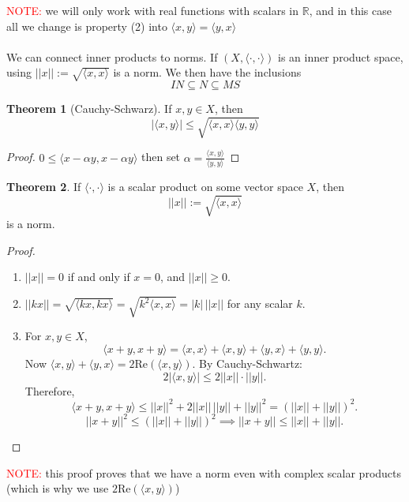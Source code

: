 \documentclass[11pt,a4paper]{article}
\theoremstyle{definition}
\newtheorem{theorem}{Theorem}[section]
\begin{document}
\noindent \textcolor{red}{NOTE:} we will only work with real functions with scalars in $\mathbb{R}$, and in this case all we change is property (2) into $\langle x, y \rangle = {\langle y, x \rangle}$
~\\ ~\\
We can connect inner products to norms. If $(X, \langle \cdot ,\cdot \rangle)$ is an inner product space, using $||x|| := \sqrt{\langle x,x\rangle }$ is a norm. We then have the inclusions 
\[
IN \subseteq N \subseteq MS
\]

\begin{theorem}[Cauchy-Schwarz]
    If $x,y\in X$, then 
    \[
    |\langle x,y \rangle | \le \sqrt{\langle x,x \rangle  \langle y,y\rangle} 
    \]
\end{theorem}

\begin{proof}
    $0 \le \langle x - \alpha y, x - \alpha y\rangle$ then set $\alpha = \frac{\langle x,y\rangle}{\langle y,y\rangle}$
\end{proof}

\begin{theorem}
If $\langle \cdot, \cdot \rangle$ is a scalar product on some vector space $X$, then
\[
||x|| := \sqrt{\langle x, x \rangle}
\]
is a norm.
\end{theorem}

\begin{proof} $ $
\begin{enumerate}
    \item $||x|| = 0$ if and only if $x = 0$, and $||x|| \geq 0$.
    \item $||kx|| = \sqrt{\langle kx, kx \rangle} = \sqrt{k^2 \langle x, x \rangle} = |k|\,||x||$ for any scalar $k$.
    \item For $x, y \in X$,
    \[
    \langle x + y, x + y \rangle = \langle x, x \rangle + \langle x, y \rangle + \langle y, x \rangle + \langle y, y \rangle.
    \]
    Now $\langle x, y \rangle + \langle y, x \rangle = 2\mathrm{Re}(\langle x, y \rangle)$.
    By Cauchy-Schwartz:
    \[
    2|\langle x, y \rangle| \leq 2||x||\cdot||y||.
    \]
    Therefore,
    \[
    \langle x+y, x+y \rangle \leq ||x||^2 + 2||x||\,||y|| + ||y||^2 = (||x|| + ||y||)^2.
    \]
    \[
    ||x+y||^2 \leq (||x|| + ||y||)^2 \implies ||x+y|| \leq ||x|| + ||y||.
    \]
\end{enumerate}
\end{proof}
\noindent 
\textcolor{red}{NOTE:} this proof proves that we have a norm even with complex scalar products (which is why we use $2 \text{Re}(\langle x, y \rangle)$)
\end{document}
